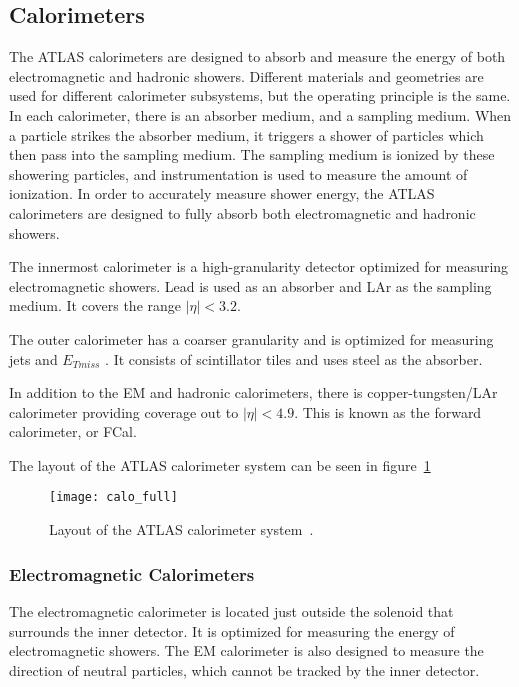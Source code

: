 \subsection{Calorimeters}\label{subsec:calorimeters}

The ATLAS calorimeters are designed to absorb and measure the energy of both electromagnetic and hadronic showers.
Different materials and geometries are used for different calorimeter subsystems, but the operating principle is the same.
In each calorimeter, there is an absorber medium, and a sampling medium.
When a particle strikes the absorber medium, it triggers a shower of particles which then pass into the sampling medium.
The sampling medium is ionized by these showering particles, and instrumentation is used to measure the amount of ionization.
In order to accurately measure shower energy, the ATLAS calorimeters are designed to fully absorb both electromagnetic and hadronic showers.

The innermost calorimeter is a high-granularity detector optimized for measuring electromagnetic showers.
Lead is used as an absorber and LAr as the sampling medium.
It covers the range $|\eta| < 3.2$.

The outer calorimeter has a coarser granularity and is optimized for measuring jets and $E_{T miss}$ .
It consists of scintillator tiles and uses steel as the absorber.

In addition to the EM and hadronic calorimeters, there is copper-tungsten/LAr calorimeter providing coverage out to
$|\eta| < 4.9$.
This is known as the forward calorimeter, or FCal.

The layout of the ATLAS calorimeter system can be seen in figure~\ref{fig:calo_full}

\begin{figure}[!ht]\centering
\texttt{[image: calo\_full]}
\caption{Layout of the ATLAS calorimeter system~\cite{atlas-detector-2008}.}
\label{fig:calo_full}
\end{figure}

\subsubsection{Electromagnetic Calorimeters}\label{subsubsec:em_cal}

The electromagnetic calorimeter is located just outside the solenoid that surrounds the inner detector.
It is optimized for measuring the energy of electromagnetic showers.
The EM calorimeter is also designed to measure the direction of neutral particles, which cannot be tracked by the inner detector.

